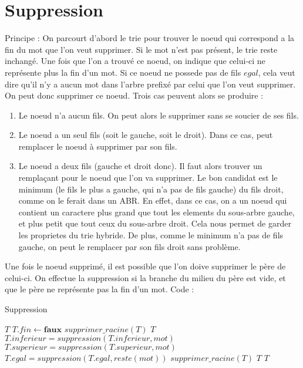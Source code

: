 \documentclass[10pt]{report}
\begin{document}
\section{Suppression} 
Principe : On parcourt d'abord le trie pour trouver le noeud qui correspond a la fin du mot que l'on veut supprimer.
Si le mot n'est pas présent, le trie reste inchangé. Une fois que l'on a trouvé ce noeud, on indique que celui-ci ne représente plus la fin d'un mot. Si ce noeud ne possede pas de fils $egal$, cela veut dire qu'il n'y a aucun mot dans l'arbre prefixé par celui que l'on veut supprimer. On peut donc supprimer ce noeud. Trois cas peuvent alors se produire : \\
\begin{enumerate}
\item Le noeud n'a aucun fils. On peut alors le supprimer sans se soucier de ses fils. 
\item Le noeud a un seul fils (soit le gauche, soit le droit). Dans ce cas, peut remplacer le noeud à supprimer par son fils.
\item Le noeud a deux fils (gauche et droit donc). Il faut alors trouver un remplaçant pour le noeud que l'on va supprimer. Le bon candidat est le minimum (le fils le plus a gauche, qui n'a pas de fils gauche) du fils droit, comme on le ferait dans un ABR. En effet, dans ce cas, on a un noeud qui contient un caractere plus grand que tout les elements du sous-arbre gauche, et plus petit que tout ceux du sous-arbre droit. Cela nous permet de garder les proprietes du trie hybride. De plus, comme le minimum n'a pas de fils gauche, on peut le remplacer par son fils droit sans problème.
\end{enumerate}
Une fois le noeud supprimé, il est possible que l'on doive supprimer le père de celui-ci. On effectue la suppression si la branche du milieu du père est vide, et que le père ne représente pas la fin d'un mot.
Code : \\
\begin{algorithm}
  \caption{Suppression}
  \begin{algorithmic}[1]
     $T$
    \EndIf
    \State $T.fin \gets \textbf{faux}$  
     $supprimer\_racine(T)$
    \Else
     $T$
    \EndIf
    \State $T.inferieur=suppression(T.inferieur,mot)$
    \State $T.superieur=suppression(T.superieur,mot)$
    \Else
    \State $T.egal=suppression(T.egal,reste(mot))$
     $supprimer\_racine(T)$
    \Else
     $T$
    \EndIf
    \EndIf
     $T$
    \EndFunction
  \end{algorithmic}
\end{algorithm}
\end{document}
